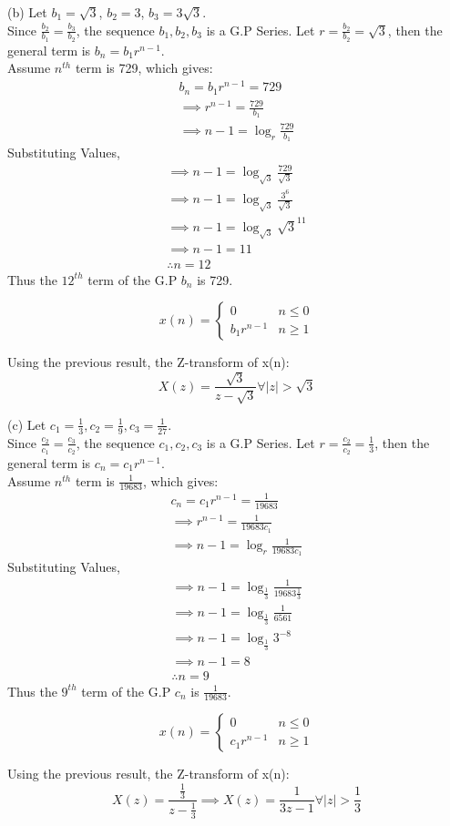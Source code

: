 \documentclass[journal,12pt,twocolumn]{IEEEtran}
\theoremstyle{remark}
\begin{document}
(b) Let $b_1 = \sqrt{3}$, $b_2 = 3$, $b_3 = 3\sqrt{3}$.\\
Since $\frac{b_2}{b_1} = \frac{b_3}{b_2}$, the sequence $b_1, b_2, b_3$ is a G.P Series.
Let $r = \frac{b_2}{b_2} = \sqrt{3}$, then the general term is $b_n = b_1 r^{n-1}$.\\
Assume $n^{th}$ term is 729, which gives: 
\begin{gather*}
    b_n = b_1 r^{n-1} = 729\\
    \implies r^{n-1} = \frac{729}{b_1}\\
    \implies n - 1 = \log_{r}{\frac{729}{b_1}}
\end{gather*}
Substituting Values,
\begin{gather*}
    \implies n - 1 = \log_{\sqrt{3}}{\frac{729}{\sqrt{3}}}\\
    \implies n - 1 = \log_{\sqrt{3}}{\frac{3^6}{\sqrt{3}}}\\
    \implies n - 1 = \log_{\sqrt{3}}{\sqrt{3}^{11}}\\
    \implies n - 1 = 11\\
    \therefore n = 12
\end{gather*}
Thus the $12^{th}$ term of the G.P $b_n$ is 729.

\[ x(n) = \begin{cases} 
      0 & n\leq 0 \\
      b_1r^{n - 1} & n\geq 1  
   \end{cases}
\]

Using the previous result, the Z-transform of x(n):
\[X(z) = \frac{\sqrt{3}}{z - \sqrt{3}}\forall { |z| > \sqrt{3}}\]


(c) Let $c_1 = \frac{1}{3}, c_2 = \frac{1}{9}, c_3 = \frac{1}{27}$.\\
Since $\frac{c_2}{c_1} = \frac{c_3}{c_2}$, the sequence $c_1, c_2, c_3$ is a G.P Series.
Let $r = \frac{c_2}{c_2} = \frac{1}{3}$, then the general term is $c_n = c_1 r^{n-1}$.\\
Assume $n^{th}$ term is $\frac{1}{19683}$, which gives: 
\begin{gather*}
    c_n = c_1 r^{n-1} = \frac{1}{19683}\\
    \implies r^{n-1} = \frac{1}{19683 c_1}\\
    \implies n - 1 = \log_{r}{\frac{1}{19683 c_1}}
\end{gather*}
Substituting Values,
\begin{gather*}
    \implies n - 1 = \log_{\frac{1}{3}}{\frac{1}{19683 \frac{1}{3}}}\\
    \implies n - 1 = \log_{\frac{1}{3}}{\frac{1}{6561}}\\
    \implies n - 1 = \log_{\frac{1}{3}}{3^{-8}}\\
    \implies n - 1 = 8\\
    \therefore n = 9
\end{gather*}
Thus the $9^{th}$ term of the G.P $c_n$ is $\frac{1}{19683}$.

\[ x(n) = \begin{cases} 
      0 & n\leq 0 \\
      c_1r^{n - 1} & n\geq 1  
   \end{cases}
\]

Using the previous result, the Z-transform of x(n):
\[
    X(z) = \frac{\frac{1}{3}}{z - \frac{1}{3}}
    \implies X(z) = \frac{1 }{3z - 1}\forall { |z| > \frac{1}{3}}
\]
\end{document}
